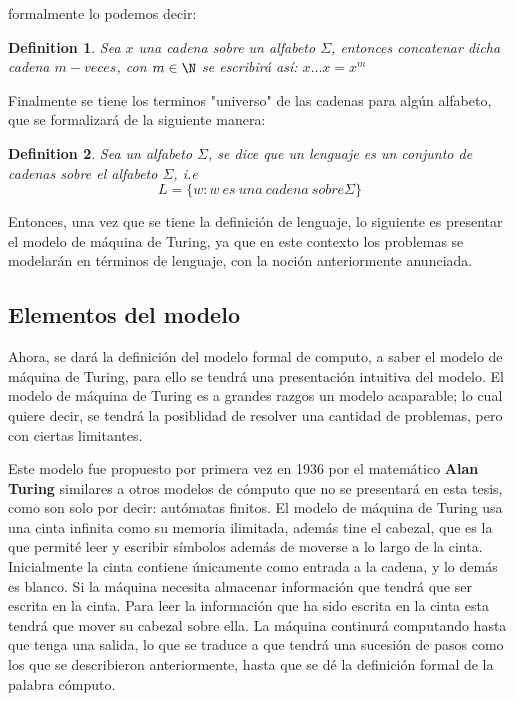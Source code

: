 \documentclass[10pt]{report}
\newtheorem{definition}{Definition}
\begin{document}
    formalmente lo podemos decir:\newline
    \begin{definition}
        Sea $x$ una cadena sobre un alfabeto $\Sigma$, entonces concatenar dicha cadena
        $m-veces$, con $m\in\N$ se escribirá así:\newline
        $x\dots x = x^m$
    \end{definition}
    Finalmente se tiene los terminos "universo" de las cadenas para algún alfabeto, que se formalizará de la
    siguiente manera:
    \begin{definition}
        Sea un alfabeto $\Sigma$, se dice que un lenguaje es un conjunto de cadenas sobre el alfabeto $\Sigma$, i.e
        \begin{equation}
            \label{eq:equation7}
             L = \{w : w\ es \ una \ cadena\ sobre \Sigma \}
        \end{equation}
    \end{definition}
    Entonces, una vez que se tiene la definición de lenguaje, lo siguiente es presentar el modelo de máquina de Turing,
    ya que en este contexto los problemas se modelarán en términos de lenguaje, con la noción anteriormente anunciada.


    \subsection{Elementos del modelo}\label{subsec:elementos-del-modelo-de-máquina-de-turing}
    Ahora, se dará la definición del modelo formal de computo, a saber el modelo de máquina de Turing,
    para ello se tendrá una presentación intuitiva del modelo.\newline
    El modelo de máquina de Turing es a grandes razgos un modelo acaparable; lo cual quiere decir, se tendrá la posiblidad
    de resolver una cantidad de problemas, pero con ciertas limitantes.
    \space

    Este modelo fue propuesto por primera vez en 1936 por el matemático \textbf{Alan Turing} similares a
    otros modelos de cómputo que no se presentará en esta tesis, como son solo por decir: autómatas finitos.
    El modelo de máquina de Turing usa una cinta infinita como su memoria ilimitada,
    además tine el cabezal, que es la que permité leer y escribir símbolos además de moverse
    a lo largo de la cinta.
    \space
    Inicialmente la cinta contiene únicamente como entrada a la cadena, y lo demás es blanco.
    Si la máquina necesita almacenar información que tendrá que ser escrita en la cinta.
    Para leer la información que ha sido escrita en la cinta esta tendrá que mover su cabezal sobre ella.\space
    La máquina continurá computando hasta que tenga una salida, lo que se traduce a que tendrá una sucesión de pasos
    como los que se describieron anteriormente, hasta que se dé la definición formal de la palabra cómputo.
    \space
\end{document}
